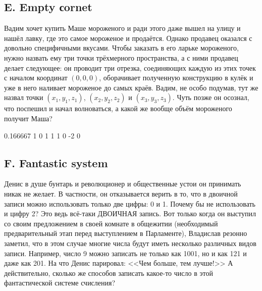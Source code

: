 \subsection*{E. Empty сornet}

Вадим хочет купить Маше мороженого и ради этого даже вышел на улицу и нашёл лавку, где это самое мороженое и продаётся. Однако продавец оказался с довольно специфичными вкусами. Чтобы заказать в его ларьке мороженого, нужно назвать ему три точки трёхмерного пространства, а с ними продавец делает следующее: он проводит три отрезка, соединяющих каждую из этих точек с началом координат $(0, 0, 0)$, оборачивает полученную конструкцию в кулёк и уже в него наливает мороженое до самых краёв. Вадим, не особо подумав, тут же назвал точки $(x_1, y_1, z_1)$, $(x_2, y_2, z_2)$ и $(x_3, y_3, z_3)$. Чуть позже он осознал, что поспешил и начал волноваться, а какой же вообще объём мороженого получит Маша?



%
{0.166667}{%
1 0 1  1 1  0 -2}%
{0}




\subsection*{F. Fantastic system}

Денис в душе бунтарь и революционер и общественные устои он принимать никак не желает. В частности, он отказывается верить в то, что в двоичной записи можно использовать только две цифры: 0 и 1. Почему бы не использовать и цифру 2? Это ведь всё-таки ДВОИЧНАЯ запись. Вот только когда он выступил со своим предложением в своей комнате в общежитии (необходимый предварительный этап перед выступлением в Парламенте), Владислав резонно заметил, что в этом случае многие числа будут иметь несколько различных видов записи. Например, число 9 можно записать не только как 1001, но и как 121 и даже как 201. На что Денис парировал: <<Чем больше, тем лучше!>> А действительно, сколько же способов записать какое-то число в этой фантастической системе счисления?

